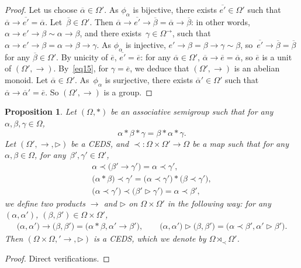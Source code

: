 \documentclass[pdftex]{sigma}
\numberwithin{equation}{section}
\newtheorem{Proposition}[Theorem]{Proposition}
 { \theoremstyle{definition}
\newtheorem{Definition}[Theorem]{Definition}
\newtheorem{Note}[Theorem]{Note}
\newtheorem{Example}[Theorem]{Example}
\newtheorem{Remark}[Theorem]{Remark}
\newtheorem{Notation}[Theorem]{Notation}}
\begin{document}
\begin{proof}
Let us choose $\overline{\alpha}\in \Omega'$. As $\phi_\alpha$ is bijective, there exists $\overline{e'}\in \Omega'$ such that $\overline{\alpha}\rightarrow \overline{e'}=\overline{\alpha}$.
Let~${\overline{\beta}\in \Omega'}$. Then $\overline{\alpha}\rightarrow \overline{e'}\rightarrow \overline{\beta}=\overline{\alpha}\rightarrow \overline{\beta}$:
in other words, $\alpha \rightarrow e'\rightarrow \beta\sim \alpha \rightarrow \beta$, and there exists~${\gamma \in \Omega^\rightarrow}$, such that $\alpha \rightarrow e'\rightarrow \beta=\alpha \rightarrow \beta \rightarrow \gamma$.
As $\phi_\alpha$ is injective, $e'\rightarrow \beta=\beta \rightarrow \gamma\sim \beta$, so~${\overline{e'}\rightarrow \overline{\beta}=\overline{\beta}}$ for any $\overline{\beta}\in \Omega'$.
By unicity of $\overline{e}$, $\overline{e'}=\overline{e}$: for any $\overline{\alpha}\in \Omega'$, $\overline{\alpha}\rightarrow\overline{e}=\overline{\alpha}$, so $\overline{e}$ is a unit of $(\Omega',\rightarrow)$.
By~\eqref{eq15}, for $\gamma=\overline{e}$, we deduce that $(\Omega',\rightarrow)$ is an abelian monoid.
Let $\overline{\alpha}\in \Omega'$. As~${\phi_\alpha}$ is surjective, there exists $\overline{\alpha}'\in \Omega'$ such that $\overline{\alpha}\rightarrow \overline{\alpha}'=\overline{e}$. So $(\Omega',\rightarrow)$ is a group. \end{proof}

{\samepage
\begin{Proposition}
Let $(\Omega,*)$ be an associative semigroup such that for any $\alpha,\beta,\gamma \in \Omega$,
\[\alpha*\beta * \gamma=\beta *\alpha*\gamma.\]
Let $(\Omega',\rightarrow,\triangleright)$ be a CEDS, and $\prec\colon\Omega \times \Omega'\longrightarrow \Omega$ be a map such that for any $\alpha,\beta \in \Omega$, for any~${\beta',\gamma'\in \Omega'}$,
\begin{gather}
\label{eq27} \alpha \prec \bigl(\beta'\rightarrow \gamma'\bigr)=\alpha \prec \gamma',\\
\label{eq28} \bigl(\alpha *\beta\bigr)\prec \gamma' =\bigl(\alpha \prec \gamma'\bigr)*\bigl(\beta \prec \gamma'\bigr),\\
\label{eq29} \bigl(\alpha\prec \gamma'\bigr)\prec \bigl(\beta'\triangleright \gamma'\bigr)=\alpha \prec \beta',
\end{gather}
we define two products $\rightarrow$ and $\triangleright$ on $\Omega\times \Omega'$ in the following way: for any $(\alpha,\alpha')$, $(\beta,\beta')\in \Omega \times \Omega'$,
\begin{gather*}
\bigl(\alpha,\alpha'\bigr)\rightarrow \bigl(\beta,\beta'\bigr)=\bigl(\alpha*\beta,\alpha'\rightarrow \beta'\bigr),\qquad
\bigl(\alpha,\alpha'\bigr)\triangleright \bigl(\beta,\beta'\bigr)=\bigl(\alpha \prec \beta',\alpha'\triangleright \beta'\bigr).
\end{gather*}
Then $(\Omega\times \Omega,'\rightarrow,\triangleright)$ is a CEDS, which we denote by $\Omega \rtimes_\prec \Omega'$.
\end{Proposition}

\begin{proof}
Direct verifications.
\end{proof}

}
\end{document}
